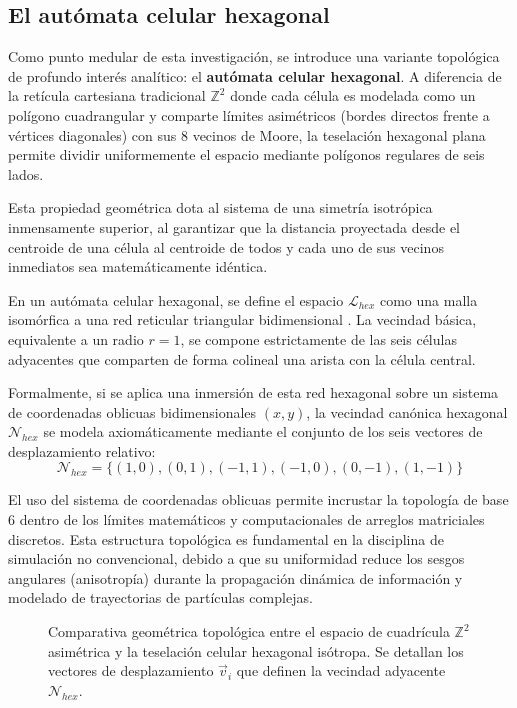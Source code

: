 \subsection{El autómata celular hexagonal}


Como punto medular de esta investigación, se introduce una variante topológica de profundo interés analítico: el \textbf{autómata celular hexagonal}. A diferencia de la retícula cartesiana tradicional $\mathbb{Z}^2$ donde cada célula es modelada como un polígono cuadrangular y comparte límites asimétricos (bordes directos frente a vértices diagonales) con sus 8 vecinos de Moore, la teselación hexagonal plana permite dividir uniformemente el espacio mediante polígonos regulares de seis lados.

Esta propiedad geométrica dota al sistema de una simetría isotrópica inmensamente superior, al garantizar que la distancia proyectada desde el centroide de una célula al centroide de todos y cada uno de sus vecinos inmediatos sea matemáticamente idéntica.

En un autómata celular hexagonal, se define el espacio $\mathcal{L}_{hex}$ como una malla isomórfica a una red reticular triangular bidimensional \cite{Basurto2009}. La vecindad básica, equivalente a un radio $r=1$, se compone estrictamente de las seis células adyacentes que comparten de forma colineal una arista con la célula central. 

Formalmente, si se aplica una inmersión de esta red hexagonal sobre un sistema de coordenadas oblicuas bidimensionales $(x, y)$, la vecindad canónica hexagonal $\mathcal{N}_{hex}$ se modela axiomáticamente mediante el conjunto de los seis vectores de desplazamiento relativo:
\begin{equation}
    \mathcal{N}_{hex} = \{ (1,0), (0,1), (-1,1), (-1,0), (0,-1), (1,-1) \}
\end{equation}

El uso del sistema de coordenadas oblicuas permite incrustar la topología de base 6 dentro de los límites matemáticos y computacionales de arreglos matriciales discretos. Esta estructura topológica es fundamental en la disciplina de simulación no convencional, debido a que su uniformidad reduce los sesgos angulares (anisotropía) durante la propagación dinámica de información y modelado de trayectorias de partículas complejas.

\begin{figure}[h]
\centering
\caption{Comparativa geométrica topológica entre el espacio de cuadrícula $\mathbb{Z}^2$ asimétrica y la teselación celular hexagonal isótropa. Se detallan los vectores de desplazamiento $\vec{v}_i$ que definen la vecindad adyacente $\mathcal{N}_{hex}$.}
\label{fig:topologia_hexagonal}
\end{figure}


